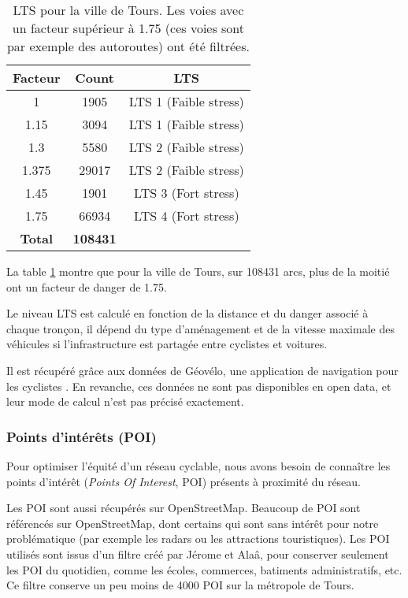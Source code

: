 \begin{table}[h]
\centering
\caption{LTS pour la ville de Tours. Les voies avec un facteur supérieur à 1.75 (ces voies sont par exemple des autoroutes) ont été filtrées.}
\vspace{0.5cm}
\begin{tabular}{|c|c|c|}
\hline
\textbf{Facteur} & \textbf{Count} & \textbf{LTS} \\
\hline
1 & 1905 & LTS 1 (Faible stress) \\
1.15 &3094 &LTS 1 (Faible stress)\\
1.3 &5580 &LTS 2 (Faible stress)\\
1.375& 29017& LTS 2 (Faible stress)\\
1.45 &1901 &LTS 3 (Fort stress)\\
1.75 &66934 &LTS 4 (Fort stress)\\
 \hline 
 \textbf{Total} & \textbf{108431} & \\
 \hline 
 \end{tabular}
\label{table:lts_tours}
\end{table}

La table \ref{table:lts_tours} montre que pour la ville de Tours, sur 108431 arcs, plus de la moitié ont un facteur de danger de 1.75. 

Le niveau LTS est calculé en fonction de la distance et du danger associé à chaque tronçon, il dépend du type d'aménagement et de la vitesse maximale des véhicules si l'infrastructure est partagée entre cyclistes et voitures.

Il est récupéré grâce aux données de Géovélo, une application de navigation pour les cyclistes \cite{géovelo}. En revanche, ces données ne sont pas disponibles en open data, et leur mode de calcul n'est pas précisé exactement. 


\subsubsection{Points d'intérêts (POI)}\label{sect:poi}

Pour optimiser l'équité d'un réseau cyclable, nous avons besoin de connaître les points d'intérêt (\emph{Points Of Interest}, POI) présents à proximité du réseau. 

Les POI sont aussi récupérés sur OpenStreetMap. Beaucoup de POI sont référencés sur OpenStreetMap, dont certains qui sont sans intérêt pour notre problématique (par exemple les radars ou les attractions touristiques). Les POI utilisés sont issus d'un filtre créé par Jérome et Alaâ, pour conserver seulement les POI du quotidien, comme les écoles, commerces, batiments administratifs, etc. Ce filtre conserve un peu moins de 4000 POI sur la métropole de Tours.


